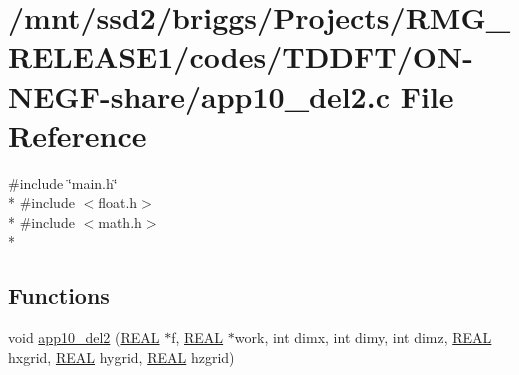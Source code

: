 \hypertarget{_t_d_d_f_t_2_o_n-_n_e_g_f-share_2app10__del2_8c}{\section{/mnt/ssd2/briggs/\-Projects/\-R\-M\-G\-\_\-\-R\-E\-L\-E\-A\-S\-E1/codes/\-T\-D\-D\-F\-T/\-O\-N-\/\-N\-E\-G\-F-\/share/app10\-\_\-del2.c File Reference}
\label{_t_d_d_f_t_2_o_n-_n_e_g_f-share_2app10__del2_8c}
}
{\ttfamily \#include \char`\"{}main.\-h\char`\"{}}\\*
{\ttfamily \#include $<$float.\-h$>$}\\*
{\ttfamily \#include $<$math.\-h$>$}\\*
\subsection*{Functions}
\begin{DoxyCompactItemize}
\item 
void \hyperlink{_t_d_d_f_t_2_o_n-_n_e_g_f-share_2app10__del2_8c_a6387616a785c19df6c02cd10c6491ef4}{app10\-\_\-del2} (\hyperlink{md_8h_a4b654506f18b8bfd61ad2a29a7e38c25}{R\-E\-A\-L} $\ast$f, \hyperlink{md_8h_a4b654506f18b8bfd61ad2a29a7e38c25}{R\-E\-A\-L} $\ast$work, int dimx, int dimy, int dimz, \hyperlink{md_8h_a4b654506f18b8bfd61ad2a29a7e38c25}{R\-E\-A\-L} hxgrid, \hyperlink{md_8h_a4b654506f18b8bfd61ad2a29a7e38c25}{R\-E\-A\-L} hygrid, \hyperlink{md_8h_a4b654506f18b8bfd61ad2a29a7e38c25}{R\-E\-A\-L} hzgrid)
\end{DoxyCompactItemize}


